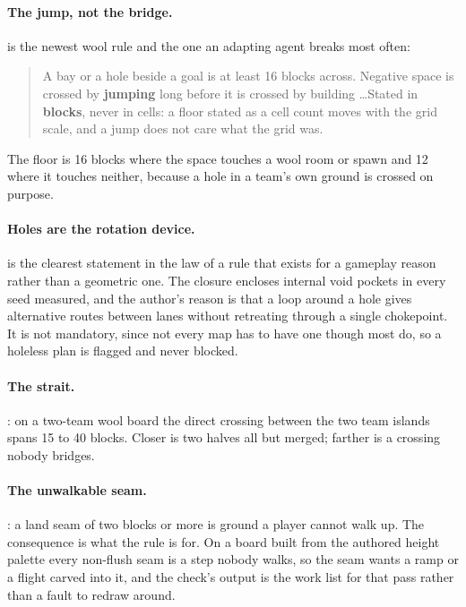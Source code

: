 \paragraph{The jump, not the bridge.}  is the newest wool rule and the
one an adapting agent breaks most often:

\begin{quote}
A bay or a hole beside a goal is at least 16 blocks across. Negative space is
crossed by \textbf{jumping} long before it is crossed by building \ldots Stated in
\textbf{blocks}, never in cells: a floor stated as a cell count moves with the
grid scale, and a jump does not care what the grid was.
\end{quote}

The floor is 16 blocks where the space touches a wool room or spawn and 12 where
it touches neither, because a hole in a team's own ground is crossed on purpose.

\paragraph{Holes are the rotation device.}  is the clearest statement in
the law of a rule that exists for a gameplay reason rather than a geometric one.
The closure encloses internal void pockets in every seed measured, and the
author's reason is that a loop around a hole gives alternative routes between
lanes without retreating through a single chokepoint. It is not mandatory, since
not every map has to have one though most do, so a holeless plan is flagged and
never blocked.

\paragraph{The strait.} : on a two-team wool board the direct crossing
between the two team islands spans 15 to 40 blocks. Closer is two halves all but
merged; farther is a crossing nobody bridges.

\paragraph{The unwalkable seam.} : a land seam of two blocks or more is
ground a player cannot walk up. The consequence is what the rule is for. On a
board built from the authored height palette every non-flush seam is a step nobody
walks, so the seam wants a ramp or a flight carved into it, and the check's output
is the work list for that pass rather than a fault to redraw around.

